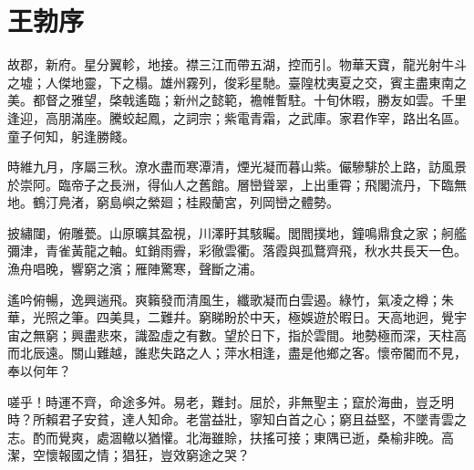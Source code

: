 \section[滕王閣序\quad{\small 王勃}]{{\normalsize 王勃}\quad {}序}
故郡，新府。星分翼軫，地接。襟三江而帶五湖，控而引。物華天寶，龍光射牛斗之墟；人傑地靈，下之榻。雄州霧列，俊彩星馳。臺隍枕夷夏之交，賓主盡東南之美。都督之雅望，棨戟遙臨；新州之懿範，襜帷暫駐。十旬休暇，勝友如雲。千里逢迎，高朋滿座。騰蛟起鳳，之詞宗；紫電青霜，之武庫。家君作宰，路出名區。童子何知，躬逢勝餞。

時維九月，序屬三秋。潦水盡而寒潭清，煙光凝而暮山紫。儼驂騑於上路，訪風景於崇阿。臨帝子之長洲，得仙人之舊館。層巒聳翠，上出重霄；飛閣流丹，下臨無地。鶴汀鳧渚，窮島嶼之縈廻；桂殿蘭宮，列岡巒之體勢。

披繡闥，俯雕甍。山原曠其盈視，川澤盱其駭矚。閭閻撲地，鐘鳴鼎食之家；舸艦彌津，青雀黃龍之軸。虹銷雨霽，彩徹雲衢。落霞與孤鶩齊飛，秋水共長天一色。漁舟唱晚，響窮之濱；雁陣驚寒，聲斷之浦。

遙吟俯暢，逸興遄飛。爽籟發而清風生，纖歌凝而白雲遏。綠竹，氣凌之樽；朱華，光照之筆。四美具，二難幷。窮睇盼於中天，極娛遊於暇日。天高地迥，覺宇宙之無窮；興盡悲來，識盈虛之有數。望於日下，指於雲間。地勢極而深，天柱高而北辰遠。關山難越，誰悲失路之人；萍水相逢，盡是他鄉之客。懷帝閽而不見，奉以何年？

嗟乎！時運不齊，命途多舛。易老，難封。屈於，非無聖主；竄於海曲，豈乏明時？所賴君子安貧，達人知命。老當益壯，寧知白首之心；窮且益堅，不墜青雲之志。酌而覺爽，處涸轍以猶懽。北海雖賒，扶搖可接；東隅已逝，桑榆非晚。高潔，空懷報國之情；猖狂，豈效窮途之哭？

